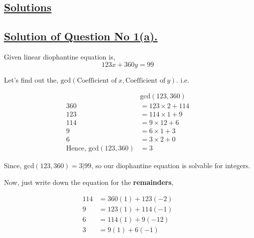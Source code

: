 \documentclass[a4paper,12pt]{article}
\begin{document}
    \pagebreak

    \begin{center}
        \section*{\underline{\huge{Solutions}}}
    \end{center}
    
    \subsection*{\underline{Solution of Question No 1(a).}}

    Given linear diophantine equation is,
    \begin{equation*}
        123x + 360y = 99 \tag{1}
    \end{equation*}

    Let's find out the, $\mbox{gcd}(\mbox{Coefficient of}\  x ,\mbox{Coefficient of}\ y).$ i.e.

    \begin{equation*}
        \begin{split}
            & \mbox{gcd}(123,360) \\[2mm]
            360 & = 123\times 2 + 114 \\[2mm]
            123 & = 114\times 1 + 9 \\[2mm]
            114 & = 9\times 12 + 6 \\[2mm]
            9 & = 6\times 1 + 3 \\[2mm]
            6 & = 3\times 2 + 0 \\[2mm]
            \mbox{Hence, gcd}(123,360) & = 3
        \end{split}    
    \end{equation*}

        
    Since, $\mbox{gcd}(123,360)=3|99$, so our diophantine equation is solvable for integers.
    \vspace*{0.2cm}

    Now, just write down the equation for the {\bf remainders},

    \begin{equation*}
        \begin{split}
            114 & = 360(1) + 123(-2) \\[2mm]
            9 & = 123(1) + 114(-1) \\[2mm]
            6 & = 114(1) + 9(-12) \\[2mm]
            3 & = 9(1) + 6(-1) \\[2mm]
        \end{split}    
    \end{equation*}
\end{document}

